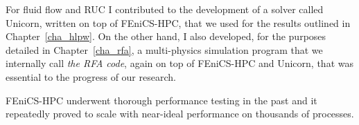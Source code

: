 For fluid flow and RUC I contributed to the development of a solver called Unicorn, written on top of FEniCS-HPC, that we used for the results outlined in Chapter~\ref{cha_hlpw}.
On the other hand, I also developed, for the purposes detailed in Chapter~\ref{cha_rfa}, a multi-physics simulation program that we internally call \emph{the RFA code}, again on top of FEniCS-HPC and Unicorn, that was essential to the progress of our research.

FEniCS-HPC underwent thorough performance testing in the past and it repeatedly proved to scale with near-ideal performance on thousands of processes.
